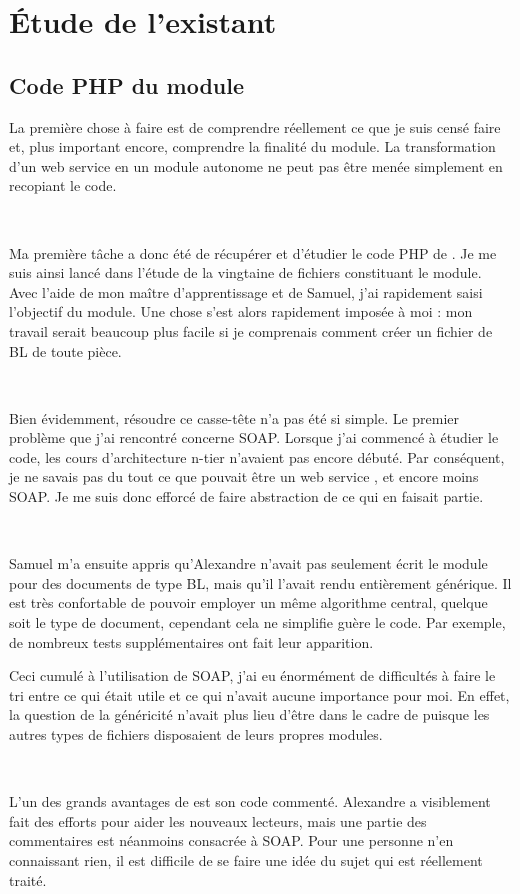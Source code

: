 \chapter{\'Etude de l'existant}

\section{Code PHP du module}
La première chose à faire est de comprendre réellement ce que je suis censé faire et, plus important encore, comprendre la finalité du module. La transformation d'un web service en un module autonome ne peut pas être menée simplement en \og recopiant \fg{} le code.

~

Ma première tâche a donc été de récupérer et d'étudier le code PHP de \pireus. Je me suis ainsi lancé dans l'étude de la vingtaine de fichiers constituant le module. Avec l'aide de mon maître d'apprentissage et de Samuel, j'ai rapidement saisi l'objectif du module. Une chose s'est alors rapidement imposée à moi : mon travail serait beaucoup plus facile si je comprenais comment créer un fichier de BL de toute pièce.

~

Bien évidemment, résoudre ce casse-tête n'a pas été si simple. Le premier problème que j'ai rencontré concerne SOAP. Lorsque j'ai commencé à étudier le code, les cours d'architecture n-tier n'avaient pas encore débuté. Par conséquent, je ne savais pas du tout ce que pouvait être un \og web service \fg{}, et encore moins SOAP. Je me suis donc efforcé de faire abstraction de ce qui en faisait partie.

~

Samuel m'a ensuite appris qu'Alexandre n'avait pas seulement écrit le module pour des documents de type BL, mais qu'il l'avait rendu entièrement générique. Il est très confortable de pouvoir employer un même algorithme central, quelque soit le type de document, cependant cela ne simplifie guère le code. Par exemple, de nombreux tests supplémentaires ont fait leur apparition.

Ceci cumulé à l'utilisation de SOAP, j'ai eu énormément de difficultés à faire le tri entre ce qui était utile et ce qui n'avait aucune importance pour moi. En effet, la question de la généricité n'avait plus lieu d'être dans le cadre de \integrale puisque les autres types de fichiers disposaient de leurs propres modules.

~

L'un des grands avantages de \pireus{} est son code commenté. Alexandre a visiblement fait des efforts pour aider les nouveaux lecteurs, mais une partie des commentaires est néanmoins consacrée à SOAP. Pour une personne n'en connaissant rien, il est difficile de se faire une idée du sujet qui est réellement traité.

